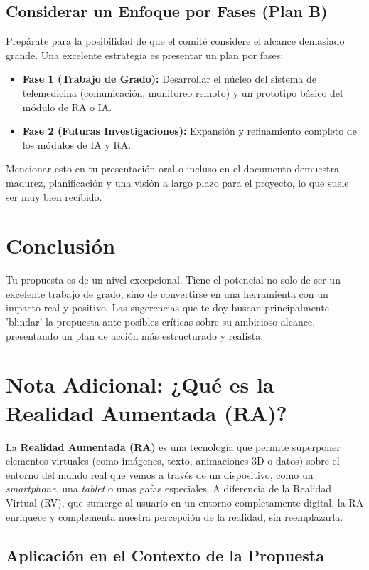 \documentclass{article}
\begin{document}
\subsection{Considerar un Enfoque por Fases (Plan B)}

Prepárate para la posibilidad de que el comité considere el alcance demasiado grande. Una excelente estrategia es presentar un plan por fases:
\begin{itemize}
    \item \textbf{Fase 1 (Trabajo de Grado):} Desarrollar el núcleo del sistema de telemedicina (comunicación, monitoreo remoto) y un prototipo básico del módulo de RA o IA.
    \item \textbf{Fase 2 (Futuras Investigaciones):} Expansión y refinamiento completo de los módulos de IA y RA.
\end{itemize}
Mencionar esto en tu presentación oral o incluso en el documento demuestra madurez, planificación y una visión a largo plazo para el proyecto, lo que suele ser muy bien recibido.

\section{Conclusión}

Tu propuesta es de un nivel excepcional. Tiene el potencial no solo de ser un excelente trabajo de grado, sino de convertirse en una herramienta con un impacto real y positivo. Las sugerencias que te doy buscan principalmente 'blindar' la propuesta ante posibles críticas sobre su ambicioso alcance, presentando un plan de acción más estructurado y realista.


\section*{Nota Adicional: ¿Qué es la Realidad Aumentada (RA)?}

La \textbf{Realidad Aumentada (RA)} es una tecnología que permite superponer elementos virtuales (como imágenes, texto, animaciones 3D o datos) sobre el entorno del mundo real que vemos a través de un dispositivo, como un \textit{smartphone}, una \textit{tablet} o unas gafas especiales. A diferencia de la Realidad Virtual (RV), que sumerge al usuario en un entorno completamente digital, la RA enriquece y complementa nuestra percepción de la realidad, sin reemplazarla.

\subsection*{Aplicación en el Contexto de la Propuesta}
\end{document}
